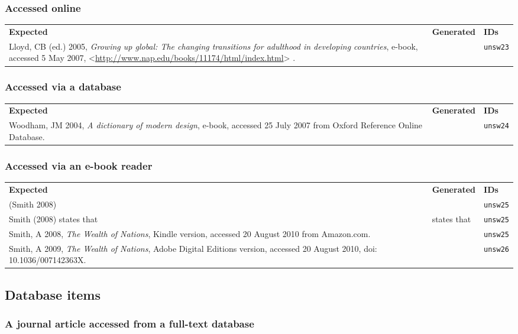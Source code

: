 \documentclass[a4paper,landscape,12pt]{article}
\newlength\q
\newlength\qr
\newenvironment{citetable}
  {\noindent\begin{longtable}{p{\q} p{\q} p{\qr}}\textbf{Expected} & \textbf{Generated} & \textbf{IDs}\\}
  {\end{longtable}}
\newcommand{\majorissue}[1]{\textcolor{red}{#1}}
\newcommand{\citeurlex}[1]{%
  \let\oldurlfont\UrlFont%
  \def\UrlFont{}%
  \textless\url{#1}\textgreater%
  \let\UrlFont\oldurlfont}
\begin{document}
\subsubsection{Accessed online}

\begin{citetable}
	Lloyd, CB (ed.) 2005, \textit{Growing up global: The changing transitions for adulthood in developing countries}, e-book, accessed 5 May 2007, \citeurlex{http://www.nap.edu/books/11174/html/index.html}. & \fullcite{unsw23} & \texttt{unsw23} \\
\end{citetable}

\subsubsection{Accessed via a database}

\begin{citetable}
	Woodham, JM 2004, \textit{A dictionary of modern design}, e-book, accessed 25 July 2007 from Oxford Reference Online Database. & \majorissue{\fullcite{unsw24}} & \texttt{unsw24} \\
\end{citetable}

\subsubsection{Accessed via an e-book reader}

\begin{citetable}
	(Smith 2008) & \parencite{unsw25} & \texttt{unsw25} \\
	Smith (2008) states that & \textcite{unsw25} states that & \texttt{unsw25} \\
	Smith, A 2008, \textit{The Wealth of Nations}, Kindle version, accessed 20 August 2010 from Amazon.com. & \fullcite{unsw25} & \texttt{unsw25} \\
	Smith, A 2009, \textit{The Wealth of Nations}, Adobe Digital Editions version, accessed 20 August 2010, doi: 10.1036/007142363X. & \majorissue{\fullcite{unsw26}} & \texttt{unsw26} \\
\end{citetable}

\subsection{Database items}

\subsubsection{A journal article accessed from a full-text database}
\end{document}
